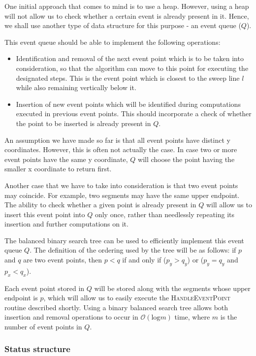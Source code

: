 \documentclass{article}
\begin{document}
One initial approach that comes to mind is to use a heap. However, using a heap will not allow us to check whether a certain event is already present in it. Hence, we shall use another type of data structure for this purpose - an event queue ($Q$).

This event queue should be able to implement the following operations:
\begin{itemize}
    \item Identification and removal of the next event point which is to be taken into consideration, so that the algorithm can move to this point for executing the designated steps. This is the event point which is closest to the sweep line $l$ while also remaining vertically below it.
    \item Insertion of new event points which will be identified during computations executed in previous event points. This should incorporate a check of whether the point to be inserted is already present in $Q$.
\end{itemize}

An assumption we have made so far is that all event points have distinct y coordinates. However, this is often not actually the case. In case two or more event points have the same y coordinate, $Q$ will choose the point having the smaller x coordinate to return first.

Another case that we have to take into consideration is that two event points may coincide. For example, two segments may have the same upper endpoint. The ability to check whether a given point is already present in $Q$ will allow us to insert this event point into $Q$ only once, rather than needlessly repeating its insertion and further computations on it.

The balanced binary search tree can be used to efficiently implement this event queue $Q$. The definition of the ordering used by the tree will be as follows: if $p$ and $q$ are two event points, then $p < q$ if and only if ($p_y > q_y$) or ($p_y = q_y$ and $p_x < q_x$).

Each event point stored in $Q$ will be stored along with the segments whose upper endpoint is $p$, which will allow us to easily execute the \textsc{HandleEventPoint} routine described shortly. Using a binary balanced search tree allows both insertion and removal operations to occur in $\mathcal{O}(\text{log} m)$ time, where $m$ is the number of event points in $Q$.

\subsubsection{Status structure}
\end{document}
